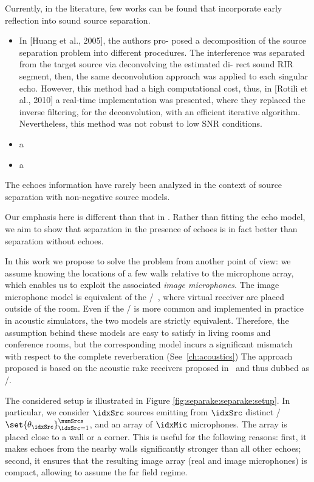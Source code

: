 \mynewline
Currently, in the literature, few works can be found that incorporate early reflection into sound source separation.
\begin{itemize}
    \item In [Huang et al., 2005], the authors pro- posed a decomposition of the source separation problem into different procedures. The interference was separated from the target source via deconvolving the estimated di- rect sound RIR segment, then, the same deconvolution approach was applied to each singular echo. However, this method had a high computational cost, thus, in [Rotili et al., 2010] a real-time implementation was presented, where they replaced the inverse filtering, for the deconvolution, with an efficient iterative algorithm. Nevertheless, this method was not robust to low SNR conditions.
    \item a
    \item a
\end{itemize}
The echoes information have rarely been analyzed in the context of source separation with non-negative source models.

Our emphasis here is different than that in .
Rather than fitting the echo model, we aim to show that separation in the presence of echoes is in fact better than separation without echoes.

In this work we propose to solve the problem from another point of view:
we assume knowing the locations of a few walls relative to the microphone array, which enables us to exploit the associated \textit{image microphones}.
The image microphone model is equivalent of the \ISMdef/~, where virtual receiver are placed outside of the room.
Even if the \ISM/ is more common and implemented in practice in acoustic simulators, the two models are strictly equivalent.
Therefore, the assumption behind these models are easy to satisfy in living rooms and conference rooms, but the corresponding model incurs a significant mismatch with respect to the complete reverberation (See~\cref{ch:acoustics})
The approach proposed is based on the acoustic rake receivers proposed in~ and thus dubbed as \SEPARAKEdef/.

\mynewline
The considered setup is illustrated in Figure \ref{fig:separake:separake:setup}.
In particular, we consider $\idxSrc$ sources emitting from $\idxSrc$ distinct \DOAdef/ $\set{\theta_\idxSrc}_{\idxSrc=1}^{\numSrcs}$, and an array of $\idxMic$ microphones.
The array is placed close to a wall or a corner. This is useful for the following reasons:
first, it makes echoes from the nearby walls significantly stronger than all other echoes;
second, it ensures that the resulting image array (real and image microphones) is compact, allowing to assume the far field regime.

